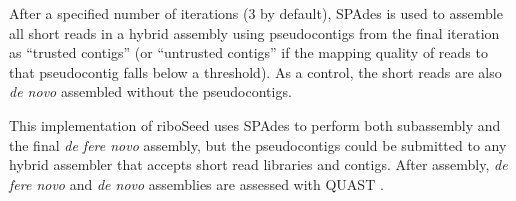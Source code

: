 After a specified number of iterations (3 by default), SPAdes is used to assemble all short reads in a hybrid assembly using pseudocontigs from the final iteration as ``trusted contigs'' (or ``untrusted contigs'' if the mapping quality of reads to that pseudocontig falls below a threshold). As a control, the short reads are also \textit{de novo} assembled without the pseudocontigs.


This implementation of riboSeed uses SPAdes to perform both subassembly and the final \textit{de fere novo} assembly, but the pseudocontigs could be submitted to any hybrid assembler that accepts short read libraries and contigs. After assembly, \textit{de fere novo} and \textit{de novo} assemblies are assessed with QUAST \cite{Gurevich2013}.
